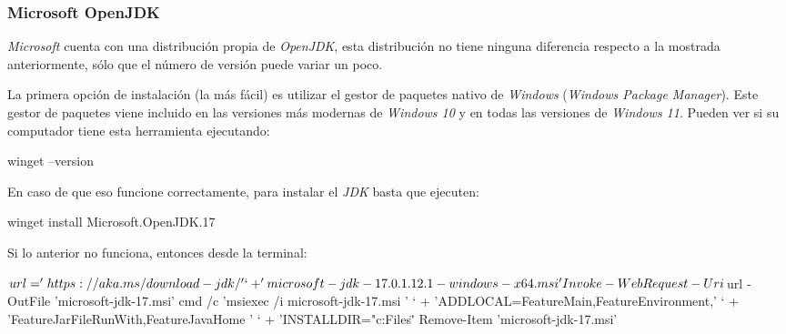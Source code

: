 \subsubsection{Microsoft OpenJDK}
  \textit{Microsoft} cuenta con una distribución propia de \textit{OpenJDK}, esta distribución no
  tiene ninguna diferencia respecto a la mostrada anteriormente, sólo que el número de versión
  puede variar un poco.

  La primera opción de instalación (la más fácil) es utilizar el gestor de paquetes nativo de 
  \textit{Windows} (\textit{Windows Package Manager}).
  Este gestor de paquetes viene incluido en las versiones más modernas de \textit{Windows 10} y en
  todas las versiones de \textit{Windows 11}.
  Pueden ver si su computador tiene esta herramienta ejecutando:

  \begin{powershell}
    winget --version
  \end{powershell}

  En caso de que eso funcione correctamente, para instalar el \textit{JDK} basta que ejecuten:

  \begin{powershell}
    winget install Microsoft.OpenJDK.17
  \end{powershell}

  Si lo anterior no funciona, entonces desde la terminal:

  \begin{powershell}
    $url = 'https://aka.ms/download-jdk/' `
      + 'microsoft-jdk-17.0.1.12.1-windows-x64.msi'
    Invoke-WebRequest -Uri $url -OutFile 'microsoft-jdk-17.msi'
    cmd /c 'msiexec /i microsoft-jdk-17.msi ' `
      + 'ADDLOCAL=FeatureMain,FeatureEnvironment,' `
      + 'FeatureJarFileRunWith,FeatureJavaHome ' `
      + 'INSTALLDIR="c:\Program Files\Java\"'
    Remove-Item 'microsoft-jdk-17.msi'
  \end{powershell}